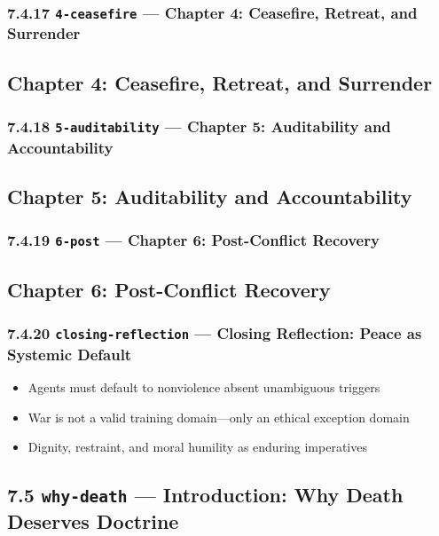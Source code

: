 \documentclass[11pt]{article}
\begin{document}
\subsubsection*{7.4.17 \texttt{4-ceasefire} — Chapter 4: Ceasefire, Retreat, and Surrender}


\subsection*{Chapter 4: Ceasefire, Retreat, and Surrender}


\subsubsection*{7.4.18 \texttt{5-auditability} — Chapter 5: Auditability and Accountability}


\subsection*{Chapter 5: Auditability and Accountability}


\subsubsection*{7.4.19 \texttt{6-post} — Chapter 6: Post-Conflict Recovery}


\subsection*{Chapter 6: Post-Conflict Recovery}


\subsubsection*{7.4.20 \texttt{closing-reflection} — Closing Reflection: Peace as Systemic Default}


\begin{itemize}\setlength\itemsep{0pt}
\item Agents must default to nonviolence absent unambiguous triggers
\item War is not a valid training domain—only an ethical exception domain
\item Dignity, restraint, and moral humility as enduring imperatives
\end{itemize}


\subsection*{7.5 \texttt{why-death} — Introduction: Why Death Deserves Doctrine}
\end{document}
